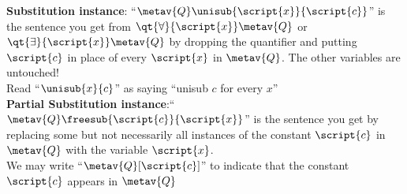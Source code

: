 \textbf{Substitution instance}: ``$\metav{Q}\unisub{\script{x}}{\script{c}}$'' is the sentence you get from $\qt{\forall}{\script{x}}\metav{Q}$ or $\qt{\exists}{\script{x}}\metav{Q}$ by dropping the quantifier and putting $\script{c}$ in place of every $\script{x}$ in $\metav{Q}$. The other variables are untouched! \\ Read ``$\unisub{x}{c}$'' as saying ``unisub $c$ for every $x$''\\[1ex]%
\textbf{Partial Substitution instance}:``$\metav{Q}\freesub{\script{c}}{\script{x}}$'' is the sentence you get by replacing some but not necessarily all instances of the constant $\script{c}$ in $\metav{Q}$ with the variable $\script{x}$. \\ We may write ``$\metav{Q}[\script{c}]$'' to indicate that the constant $\script{c}$ appears in $\metav{Q}$




